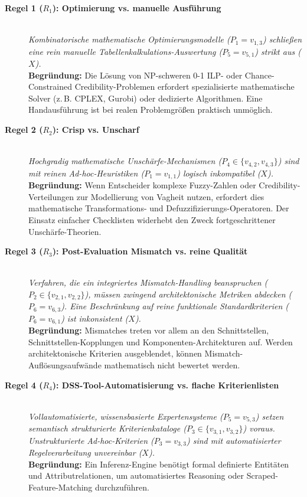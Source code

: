 \begin{description}
    \item[\textbf{Regel 1 ($R_1$): Optimierung vs. manuelle Ausführung}] \\
    \textit{Kombinatorische mathematische Optimierungsmodelle ($P_1 = v_{1,3}$) schließen eine rein manuelle Tabellenkalkulations-Auswertung ($P_5 = v_{5,1}$) strikt aus ($X$).} \\
    \textbf{Begründung:} Die Lösung von NP-schweren 0-1 ILP- oder Chance-Constrained Credibility-Problemen erfordert spezialisierte mathematische Solver (z.\,B. CPLEX, Gurobi) oder dedizierte Algorithmen. Eine Handausführung ist bei realen Problemgrößen praktisch unmöglich.

    \item[\textbf{Regel 2 ($R_2$): Crisp vs. Unscharf}] \\
    \textit{Hochgradig mathematische Unschärfe-Mechanismen ($P_4 \in \{v_{4,2}, v_{4,3}\}$) sind mit reinen Ad-hoc-Heuristiken ($P_1 = v_{1,1}$) logisch inkompatibel ($X$).} \\
    \textbf{Begründung:} Wenn Entscheider komplexe Fuzzy-Zahlen oder Credibility-Verteilungen zur Modellierung von Vagheit nutzen, erfordert dies mathematische Transformations- und Defuzzifizierungs-Operatoren. Der Einsatz einfacher Checklisten widerhebt den Zweck fortgeschrittener Unschärfe-Theorien.

    \item[\textbf{Regel 3 ($R_3$): Post-Evaluation Mismatch vs. reine Qualität}] \\
    \textit{Verfahren, die ein integriertes Mismatch-Handling beanspruchen ($P_2 \in \{v_{2,1}, v_{2,2}\}$), müssen zwingend architektonische Metriken abdecken ($P_6 = v_{6,3}$). Eine Beschränkung auf reine funktionale Standardkriterien ($P_6 = v_{6,1}$) ist inkonsistent ($X$).} \\
    \textbf{Begründung:} Mismatches treten vor allem an den Schnittstellen, Schnittstellen-Kopplungen und Komponenten-Architekturen auf. Werden architektonische Kriterien ausgeblendet, können Mismatch-Auflösungsaufwände mathematisch nicht bewertet werden.

    \item[\textbf{Regel 4 ($R_4$): DSS-Tool-Automatisierung vs. flache Kriterienlisten}] \\
    \textit{Vollautomatisierte, wissensbasierte Expertensysteme ($P_5 = v_{5,3}$) setzen semantisch strukturierte Kriterienkataloge ($P_3 \in \{v_{3,1}, v_{3,2}\}$) voraus. Unstrukturierte Ad-hoc-Kriterien ($P_3 = v_{3,3}$) sind mit automatisierter Regelverarbeitung unvereinbar ($X$).} \\
    \textbf{Begründung:} Ein Inferenz-Engine benötigt formal definierte Entitäten und Attributrelationen, um automatisiertes Reasoning oder Scraped-Feature-Matching durchzuführen.
\end{description}

